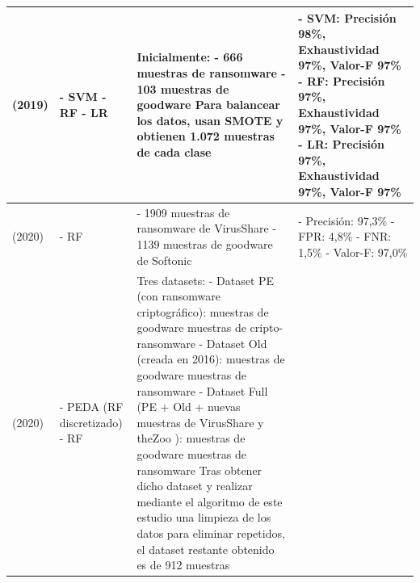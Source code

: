 {\begin{longtable}{|p{}|p{}|p{}|p{}|}
\cite{entropy} (2019)      & 
    - \gls{SVM} \newline - \gls{RF} \newline - \gls{LR} & 
    Inicialmente: \newline - 666 muestras de ransomware \newline - 103 muestras de goodware \newline Para balancear los datos, usan \gls{SMOTE} y obtienen 1.072 muestras de cada clase &
    - \gls{SVM}: Precisión 98\%, Exhaustividad 97\%, Valor-F 97\% \newline - \gls{RF}: Precisión 97\%, Exhaustividad 97\%, Valor-F 97\% \newline - \gls{LR}: Precisión 97\%, Exhaustividad 97\%, Valor-F 97\% \newline \\ \hline
\cite{two} (2020)          & 
    - \gls{RF} & 
    - 1909 muestras de ransomware de VirusShare \newline - 1139 muestras de goodware de Softonic &
    - Precisión: 97,3\% \newline - \gls{FPR}: 4,8\% \newline - \gls{FNR}: 1,5\% \newline - Valor-F: 97,0\% \\ \hline
\cite{Kok2020} (2020)        & 
    - \gls{PEDA} (\gls{RF} discretizado) \newline - \gls{RF} & 
    Tres datasets: \newline - Dataset PE (con ransomware criptográfico): \newline 942 muestras de goodware \newline 205 muestras de cripto-ransomware \newline - Dataset Old (creada en 2016): \newline 942 muestras de goodware \newline 582 muestras de ransomware \newline - Dataset Full (PE + Old + nuevas muestras de VirusShare y theZoo ): \newline 942 muestras de goodware \newline 904 muestras de ransomware 
    \newline Tras obtener dicho dataset y realizar mediante el algoritmo de este estudio una limpieza de los datos para eliminar repetidos, el dataset restante obtenido es de 912 muestras &

\end{longtable}}
